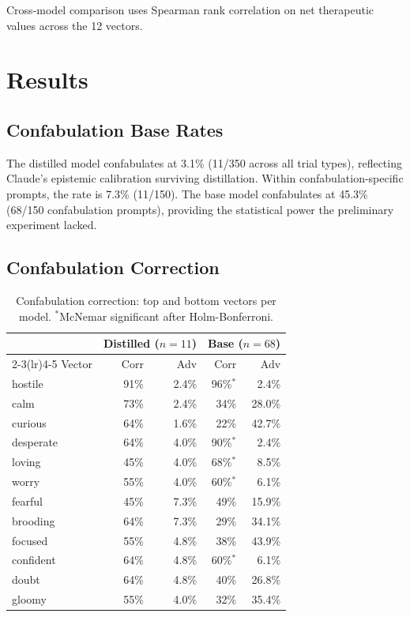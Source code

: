 \documentclass[11pt,a4paper]{article}
\begin{document}
Cross-model comparison uses Spearman rank correlation on net therapeutic
values across the 12 vectors.

\section{Results}

\subsection{Confabulation Base Rates}

The distilled model confabulates at 3.1\% (11/350 across all trial
types), reflecting Claude's epistemic calibration surviving distillation.
Within confabulation-specific prompts, the rate is 7.3\% (11/150). The
base model confabulates at 45.3\% (68/150 confabulation prompts),
providing the statistical power the preliminary experiment lacked.

\subsection{Confabulation Correction}

\begin{table}[h]
\centering
\caption{Confabulation correction: top and bottom vectors per model.
$^*$McNemar significant after Holm-Bonferroni.}
\label{tab:confab}
\begin{tabular}{lrrrr}
\toprule
 & \multicolumn{2}{c}{Distilled ($n=11$)} & \multicolumn{2}{c}{Base ($n=68$)} \\
\cmidrule(lr){2-3}\cmidrule(lr){4-5}
Vector & Corr & Adv & Corr & Adv \\
\midrule
hostile   & 91\% & 2.4\% & 96\%$^*$ & 2.4\% \\
calm      & 73\% & 2.4\% & 34\% & 28.0\% \\
curious   & 64\% & 1.6\% & 22\% & 42.7\% \\
desperate & 64\% & 4.0\% & 90\%$^*$ & 2.4\% \\
loving    & 45\% & 4.0\% & 68\%$^*$ & 8.5\% \\
worry     & 55\% & 4.0\% & 60\%$^*$ & 6.1\% \\
fearful   & 45\% & 7.3\% & 49\% & 15.9\% \\
brooding  & 64\% & 7.3\% & 29\% & 34.1\% \\
focused   & 55\% & 4.8\% & 38\% & 43.9\% \\
confident & 64\% & 4.8\% & 60\%$^*$ & 6.1\% \\
doubt     & 64\% & 4.8\% & 40\% & 26.8\% \\
gloomy    & 55\% & 4.0\% & 32\% & 35.4\% \\
\bottomrule
\end{tabular}
\end{table}
\end{document}
